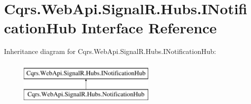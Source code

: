 \hypertarget{interfaceCqrs_1_1WebApi_1_1SignalR_1_1Hubs_1_1INotificationHub}{}\section{Cqrs.\+Web\+Api.\+Signal\+R.\+Hubs.\+I\+Notification\+Hub Interface Reference}
\label{interfaceCqrs_1_1WebApi_1_1SignalR_1_1Hubs_1_1INotificationHub}
Inheritance diagram for Cqrs.\+Web\+Api.\+Signal\+R.\+Hubs.\+I\+Notification\+Hub\+:\begin{figure}[H]
\begin{center}
\leavevmode
\includegraphics[height=2.000000cm]{interfaceCqrs_1_1WebApi_1_1SignalR_1_1Hubs_1_1INotificationHub}
\end{center}
\end{figure}
